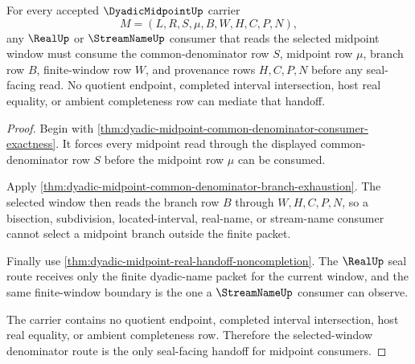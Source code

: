 \begin{theorem}
\label{thm:dyadic-midpoint-selected-window-denominator-seal}
For every accepted $\DyadicMidpointUp$ carrier
$$
M=(L,R,S,\mu,B,W,H,C,P,N),
$$
any $\RealUp$ or $\StreamNameUp$ consumer that reads the selected midpoint window must consume the common-denominator row $S$, midpoint row $\mu$, branch row $B$, finite-window row $W$, and provenance rows $H,C,P,N$ before any seal-facing read. No quotient endpoint, completed interval intersection, host real equality, or ambient completeness row can mediate that handoff.
\end{theorem}
\begin{proof}
Begin with \autoref{thm:dyadic-midpoint-common-denominator-consumer-exactness}. It forces every midpoint read through the displayed common-denominator row $S$ before the midpoint row $\mu$ can be consumed.

Apply \autoref{thm:dyadic-midpoint-common-denominator-branch-exhaustion}. The selected window then reads the branch row $B$ through $W,H,C,P,N$, so a bisection, subdivision, located-interval, real-name, or stream-name consumer cannot select a midpoint branch outside the finite packet.

Finally use \autoref{thm:dyadic-midpoint-real-handoff-noncompletion}. The $\RealUp$ seal route receives only the finite dyadic-name packet for the current window, and the same finite-window boundary is the one a $\StreamNameUp$ consumer can observe.

The carrier contains no quotient endpoint, completed interval intersection, host real equality, or ambient completeness row. Therefore the selected-window denominator route is the only seal-facing handoff for midpoint consumers.
\end{proof}

